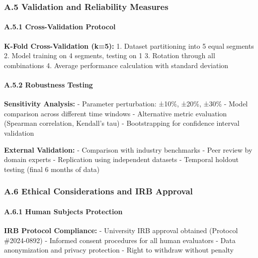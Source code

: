 \documentclass[12pt,a4paper]{article}
\begin{document}
{{{{{\hypertarget{a.5-validation-and-reliability-measures}{%
\subsubsection{A.5 Validation and Reliability
Measures}\label{a.5-validation-and-reliability-measures}}

\hypertarget{a.5.1-cross-validation-protocol}{%
\paragraph{A.5.1 Cross-Validation
Protocol}\label{a.5.1-cross-validation-protocol}}

\textbf{K-Fold Cross-Validation (k=5):} 1. Dataset partitioning into 5
equal segments 2. Model training on 4 segments, testing on 1 3. Rotation
through all combinations 4. Average performance calculation with
standard deviation

\hypertarget{a.5.2-robustness-testing}{%
\paragraph{A.5.2 Robustness Testing}\label{a.5.2-robustness-testing}}

\textbf{Sensitivity Analysis:} - Parameter perturbation: ±10\%, ±20\%,
±30\% - Model comparison across different time windows - Alternative
metric evaluation (Spearman correlation, Kendall's tau) - Bootstrapping
for confidence interval validation

\textbf{External Validation:} - Comparison with industry benchmarks -
Peer review by domain experts - Replication using independent datasets -
Temporal holdout testing (final 6 months of data)

\hypertarget{a.6-ethical-considerations-and-irb-approval}{%
\subsubsection{A.6 Ethical Considerations and IRB
Approval}\label{a.6-ethical-considerations-and-irb-approval}}

\hypertarget{a.6.1-human-subjects-protection}{%
\paragraph{A.6.1 Human Subjects
Protection}\label{a.6.1-human-subjects-protection}}

\textbf{IRB Protocol Compliance:} - University IRB approval obtained
(Protocol \#2024-0892) - Informed consent procedures for all human
evaluators - Data anonymization and privacy protection - Right to
withdraw without penalty

}}}}}
\end{document}
